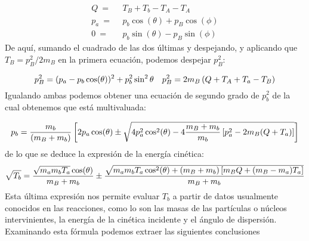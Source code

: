 \begin{equation}
	\begin{split}
		Q \ = \ & \ T_B + T_b - T_A - T_A \\
		p_a \  = \ & \ p_b \cos (\theta) + p_B \cos (\phi) \\
		0 \ = \ & \ p_b \sin (\theta) - p_B \sin (\phi)
	\end{split}
\end{equation}
De aquí, sumando el cuadrado de las dos últimas y despejando, y aplicando que $T_B=p^2_B/2m_B$ en la primera ecuación, podemos despejar $p_B^2$:

\begin{equation}
	p_B^2 = (p_a - p_b \cos (\theta))^2 + p_b^2 \sin^2 \theta \quad p_B^2 = 2m_B \left( Q+T_A+T_a-T_B \right)
\end{equation} 
Igualando ambas podemos obtener una ecuación de segundo grado de $p_b^2$ de la cual obtenemos que está multivaluada:

\begin{equation}
	p_b = \frac{m_b}{(m_B + m_b)} \left[ 2p_a \cos (\theta) \pm \sqrt{4p_a^2 \cos^2 (\theta)- 4\frac{m_B+m_b}{m_b} \left[ p_a^2  -2m_B(Q+T_a) \right] } \right]
\end{equation}
de lo que se deduce la expresión de la energía cinética:
\begin{equation}
	\sqrt{T_b} = \frac{\sqrt{m_a m_b T_a}  \cos (\theta)}{m_B+m_b} \pm \frac{\sqrt{m_am_b T_a \cos^2 (\theta) + (m_B+m_b) \left[ m_BQ+(m_B-m_a)T_a \right]}}{m_B+m_b}   \label{Ec:03-02-07}       
\end{equation}
Esta última expresión nos permite evaluar $T_b$  a partir de datos usualmente conocidos en las reacciones, como lo son las masas de las partículas o núcleos intervinientes, la energía de la cinética incidente y el ángulo de dispersión. Examinando esta fórmula podemos extraer las siguientes conclusiones

